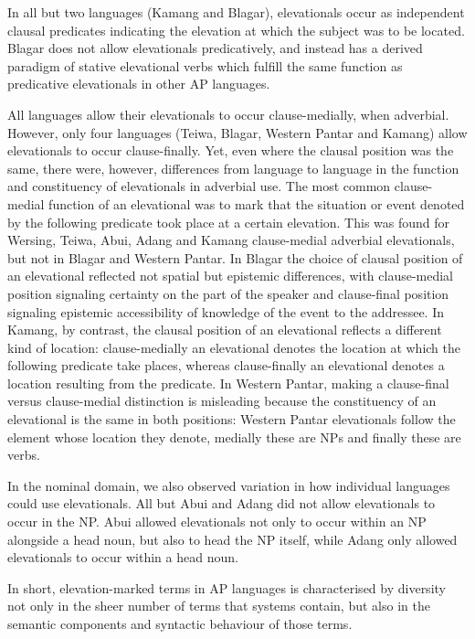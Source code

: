 In all but two languages (Kamang and Blagar), elevationals occur as independent clausal predicates indicating the elevation at which the subject was to be located. Blagar does not allow elevationals predicatively, and instead has a derived paradigm of stative elevational verbs which fulfill the same function as predicative elevationals in other AP languages.

All languages allow their elevationals to occur clause-medially, when adverbial. However, only four languages (Teiwa, Blagar, Western Pantar and Kamang) allow elevationals to occur clause-finally. Yet, even where the clausal position was the same, there were, however, differences from language to language in the function and constituency of elevationals in adverbial use. The most common clause-medial function of an elevational was to mark that the situation or event denoted by the following predicate took place at a certain elevation. This was found for Wersing, Teiwa, Abui, Adang and Kamang clause-medial adverbial elevationals, but not in Blagar and Western Pantar. In Blagar the choice of clausal position of an elevational reflected not spatial but epistemic differences, with clause-medial position signaling certainty on the part of the speaker and clause-final position signaling epistemic accessibility of knowledge of the event to the addressee. In Kamang, by contrast, the clausal position of an elevational reflects a different kind of location: clause-medially an elevational denotes the location at which the following predicate take places, whereas clause-finally an elevational denotes a location resulting from the predicate. In Western Pantar, making a clause-final versus clause{}-medial distinction is misleading because the constituency of an elevational is the same in both positions: Western Pantar elevationals follow the element whose location they denote, medially these are NPs and finally these are verbs.

In the nominal domain, we also observed variation in how individual languages could use elevationals. All but Abui and Adang did not allow elevationals to occur in the NP. Abui allowed elevationals not only to occur within an NP alongside a head noun, but also to head the NP itself, while Adang only allowed elevationals to occur within a head noun.

In short, elevation-marked terms in AP languages is characterised by diversity not only in the sheer number of terms that systems contain, but also in the semantic components and syntactic behaviour of those terms.

